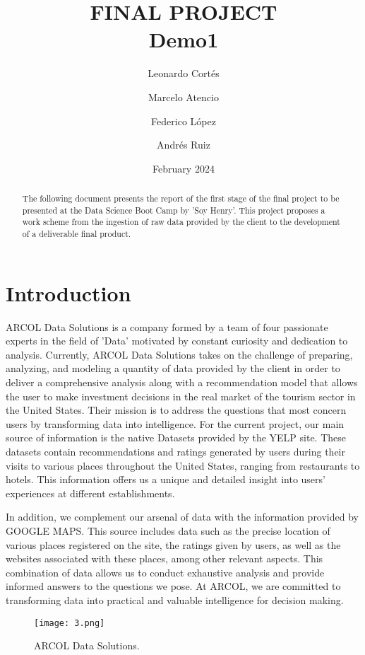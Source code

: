 \documentclass[12pt]{article}
\title{FINAL PROJECT\\
\large Demo1}
\author{Leonardo Cortés \and Marcelo Atencio \and Federico López \and Andrés Ruiz}
\date{February 2024}
\begin{document}
\maketitle

\begin{abstract}
The following document presents the report of the first stage of the final project to be presented at the Data Science Boot Camp by 'Soy Henry'. This project proposes a work scheme from the ingestion of raw data provided by the client to the development of a deliverable final product.
\end{abstract}

\tableofcontents

\section{Introduction}
ARCOL Data Solutions is a company formed by a team of four passionate experts in the field of 'Data' motivated by constant curiosity and dedication to analysis. Currently, ARCOL Data Solutions takes on the challenge of preparing, analyzing, and modeling a quantity of data provided by the client in order to deliver a comprehensive analysis along with a recommendation model that allows the user to make investment decisions in the real market of the tourism sector in the United States.
Their mission is to address the questions that most concern users by transforming data into intelligence. 
For the current project, our main source of information is the native Datasets provided by the YELP site. These datasets contain recommendations and ratings generated by users during their visits to various places throughout the United States, ranging from restaurants to hotels. This information offers us a unique and detailed insight into users' experiences at different establishments.

In addition, we complement our arsenal of data with the information provided by GOOGLE MAPS. This source includes data such as the precise location of various places registered on the site, the ratings given by users, as well as the websites associated with these places, among other relevant aspects. This combination of data allows us to conduct exhaustive analysis and provide informed answers to the questions we pose. At ARCOL, we are committed to transforming data into practical and valuable intelligence for decision making.

\begin{figure}[H]
  \centering
  \texttt{[image: 3.png]}
  \caption{ARCOL Data Solutions.}
  \label{fig:ARCOL Data Solutions}
\end{figure}
\end{document}
